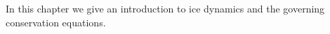 
In this chapter we give an introduction to ice dynamics and the governing conservation equations.





